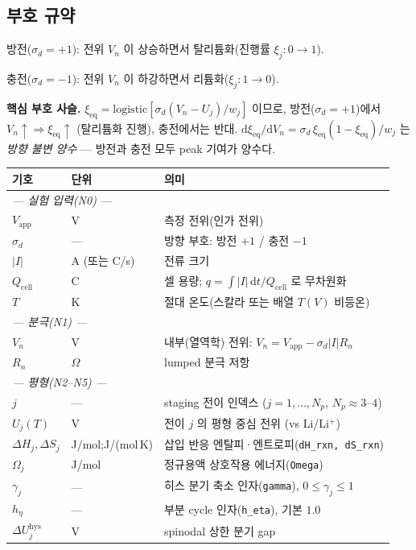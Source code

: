 \documentclass[11pt,a4paper]{article}
\newcommand{\dd}{\mathrm{d}}
\newcommand{\app}{\mathrm{app}}
\newcommand{\eq}{\mathrm{eq}}
\newcommand{\cell}{\mathrm{cell}}
\newcommand{\hys}{\mathrm{hys}}
\begin{document}
\subsection{부호 규약}

방전($\sigma_d=+1$): 전위 $V_n$ 이 상승하면서 탈리튬화(진행률 $\xi_j: 0\to1$).

충전($\sigma_d=-1$): 전위 $V_n$ 이 하강하면서 리튬화($\xi_j: 1\to0$).

\textbf{핵심 부호 사슬.} $\xi_\eq = \mathrm{logistic}[\sigma_d(V_n-U_j)/w_j]$ 이므로,
방전($\sigma_d=+1$)에서 $V_n\uparrow\Rightarrow\xi_\eq\uparrow$ (탈리튬화 진행), 충전에서는 반대.
$\dd\xi_\eq/\dd V_n = \sigma_d\,\xi_\eq(1-\xi_\eq)/w_j$ 는 \emph{방향 불변 양수} — 방전과
충전 모두 peak 기여가 양수다.

\begin{longtable}{p{} p{} p{}}
\toprule 기호 & 단위 & 의미 \\ \midrule \endhead
\multicolumn{3}{l}{\emph{--- 실험 입력(N0) ---}}\\
$V_\app$ & V & 측정 전위(인가 전위)\\
$\sigma_d$ & --- & 방향 부호: 방전 $+1$ / 충전 $-1$\\
$|I|$ & A (또는 C/s) & 전류 크기\\
$Q_\cell$ & C & 셀 용량; $q=\int|I|\,\dd t/Q_\cell$ 로 무차원화\\
$T$ & K & 절대 온도(스칼라 또는 배열 $T(V)$ 비등온)\\
\multicolumn{3}{l}{\emph{--- 분극(N1) ---}}\\
$V_n$ & V & 내부(열역학) 전위: $V_n=V_\app-\sigma_d|I|R_n$\\
$R_n$ & $\Omega$ & lumped 분극 저항\\
\multicolumn{3}{l}{\emph{--- 평형(N2--N5) ---}}\\
$j$ & --- & staging 전이 인덱스 ($j=1,\dots,N_p$, $N_p\approx3$--$4$)\\
$U_j(T)$ & V & 전이 $j$ 의 평형 중심 전위 (vs Li/Li$^+$)\\
$\Delta H_j,\Delta S_j$ & J/mol;\;J/(mol\,K) & 삽입 반응 엔탈피·엔트로피(\texttt{dH\_rxn, dS\_rxn})\\
$\Omega_j$ & J/mol & 정규용액 상호작용 에너지(\texttt{Omega})\\
$\gamma_j$ & --- & 히스 분기 축소 인자(\texttt{gamma}), $0\le\gamma_j\le1$\\
$h_\eta$ & --- & 부분 cycle 인자(\texttt{h\_eta}), 기본 $1.0$\\
$\Delta U_j^\hys$ & V & spinodal 상한 분기 gap\\

\end{longtable}
\end{document}
